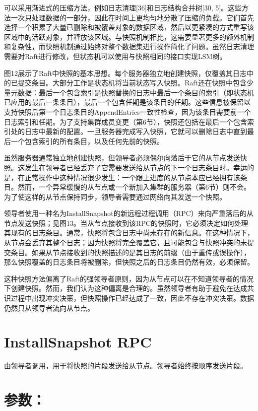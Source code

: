 \documentclass[12pt,a4paper]{report} %
\begin{document}
可以采用渐进式的压缩方法，例如日志清理[36]和日志结构合并树[30, 5]。这些方法一次只处理数据的一部分，因此在时间上更均匀地分散了压缩的负载。它们首先选择一个积累了大量已删除和被覆盖对象的数据区域，然后以更紧凑的方式重写该区域中的活跃对象，并释放该区域。与快照机制相比，这需要显著更多的额外机制和复杂性，而快照机制通过始终对整个数据集进行操作简化了问题。虽然日志清理需要对Raft进行修改，但状态机可以使用与快照相同的接口实现LSM树。

图12展示了Raft中快照的基本思想。每个服务器独立地创建快照，仅覆盖其日志中的已提交条目。大部分工作是状态机将当前状态写入快照。Raft还在快照中包含少量元数据：最后一个包含索引是快照替换的日志中最后一个条目的索引（即状态机已应用的最后一条条目），最后一个包含任期是该条目的任期。这些信息被保留以支持快照后第一个日志条目的AppendEntries一致性检查，因为该条目需要前一个日志索引和任期。为了支持集群成员变更（第6节），快照还包括在最后一个包含索引处的日志中最新的配置。一旦服务器完成写入快照，它就可以删除日志中直到最后一个包含索引的所有条目，以及任何先前的快照。

虽然服务器通常独立地创建快照，但领导者必须偶尔向落后于它的从节点发送快照。这发生在领导者已经丢弃了它需要发送给从节点的下一个日志条目时。幸运的是，在正常操作中这种情况很少发生：一个跟上进度的从节点本应已经拥有该条目。然而，一个异常缓慢的从节点或一个新加入集群的服务器（第6节）则不会。为了使这样的从节点保持同步，领导者需要通过网络向其发送一个快照。

领导者使用一种名为InstallSnapshot的新远程过程调用（RPC）来向严重落后的从节点发送快照；见图13。当从节点接收到该RPC的快照时，它必须决定如何处理其现有的日志条目。通常，快照将包含日志中尚未存在的新信息。在这种情况下，从节点会丢弃其整个日志；因为快照将完全覆盖它，且可能包含与快照冲突的未提交条目。如果从节点接收到的快照描述的是其日志的前缀（由于重传或误操作），那么快照覆盖的日志条目将被删除，但快照之后的日志条目仍然有效，必须保留。

这种快照方法偏离了Raft的强领导者原则，因为从节点可以在不知道领导者的情况下创建快照。然而，我们认为这种偏离是合理的。虽然领导者有助于避免在达成共识过程中出现冲突决策，但快照操作已经达成了一致，因此不存在冲突决策。数据仍然只从领导者流向从节点。

\section*{InstallSnapshot RPC}

由领导者调用，用于将快照的片段发送给从节点。领导者始终按顺序发送片段。

\section*{参数：}
\end{document}
